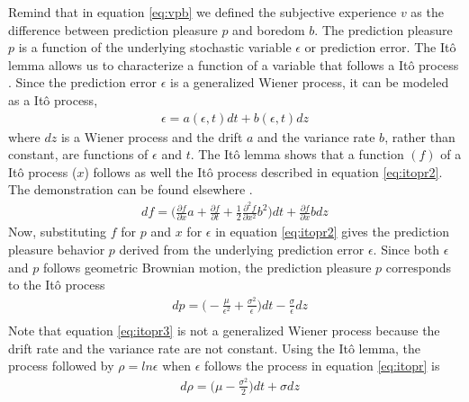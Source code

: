 \documentclass[11pt, onecolumn]{article}
\begin{document}
Remind that in equation \ref{eq:vpb} we defined the subjective experience $v$ as the difference between prediction pleasure $p$ and boredom $b$. The prediction pleasure $p$ is a function of the underlying stochastic variable $\epsilon$ or prediction error. The It\^{o} lemma allows us to characterize a function of a variable that follows a It\^{o} process \citep{ito_stochastic_1951}. Since the prediction error $\epsilon$ is a generalized Wiener process, it can be modeled as a It\^{o} process, 
\begin{equation*}
\begin{split}
   \epsilon = a(\epsilon,t)dt + b(\epsilon,t)dz
\end{split}
\label{eq:itopr}
\end{equation*}
where $dz$ is a Wiener process and the drift $a$ and the variance rate $b$, rather than constant, are functions of $\epsilon$ and $t$. The It\^{o} lemma shows that a function $(f)$ of a It\^{o} process ($x$) follows as well the It\^{o} process described in equation \ref{eq:itopr2}. The demonstration can be found elsewhere \citep{shreve_stochastic_2010}. 
\begin{equation}
\begin{split}
   df = \bigg(\frac{\partial f}{\partial x} a  + \frac{\partial f}{\partial t} + \frac{1}{2}\frac{\partial ^2 f}{\partial x^2} b^2 \bigg)dt + \frac{\partial f}{\partial x}b dz
\end{split}
\label{eq:itopr2}
\end{equation}
Now, substituting $f$ for $p$ and $x$ for $\epsilon$ in equation \ref{eq:itopr2} gives the prediction pleasure behavior $p$ derived from the underlying prediction error $\epsilon$. Since both $\epsilon$ and $p$ follows geometric Brownian motion, the prediction pleasure $p$ corresponds to the It\^{o} process  
\begin{equation}
\begin{split}
 & dp =  \big(- \frac{\mu}{\epsilon^2} + \frac{\sigma^2}{\epsilon}\big)dt - \frac{\sigma}{\epsilon}dz \\
\end{split}
\label{eq:itopr3}
\end{equation}
Note that equation \ref{eq:itopr3} is not a generalized Wiener process because the drift rate and the variance rate are not constant.
Using the It\^{o} lemma, the process followed by $\rho = ln \epsilon$ when $\epsilon$ follows the process in equation \ref{eq:itopr} is
\begin{equation}
\begin{split}
&  d \rho =  \bigg( \mu - \frac{\sigma^2}{2} \bigg)dt + \sigma dz \\
\end{split}
\label{eq:itoprex}
\end{equation}
\end{document}
